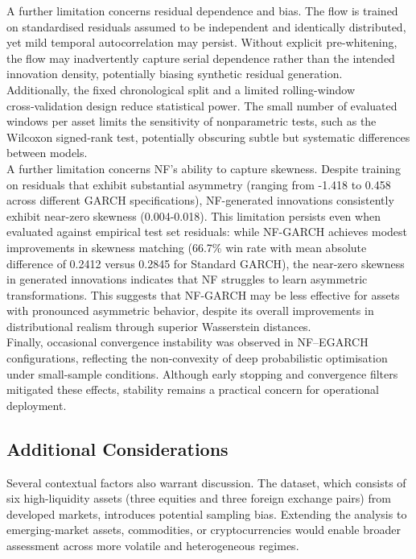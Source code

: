 \documentclass[oneside,12pt]{CUEDthesisPSnPDF}
\begin{document}
\medskip
\noindent
A further limitation concerns residual dependence and bias. The flow is trained on standardised residuals assumed to be independent and identically distributed, yet mild temporal autocorrelation may persist. Without explicit pre-whitening, the flow may inadvertently capture serial dependence rather than the intended innovation density, potentially biasing synthetic residual generation.\\

\medskip
\noindent
Additionally, the fixed chronological split and a limited rolling-window cross‑validation design reduce statistical power. The small number of evaluated windows per asset limits the sensitivity of nonparametric tests, such as the Wilcoxon signed‑rank test, potentially obscuring subtle but systematic differences between models.\\

\medskip
\noindent
A further limitation concerns NF's ability to capture skewness. Despite training on residuals that exhibit substantial asymmetry (ranging from -1.418 to 0.458 across different GARCH specifications), NF-generated innovations consistently exhibit near-zero skewness (0.004-0.018). This limitation persists even when evaluated against empirical test set residuals: while NF-GARCH achieves modest improvements in skewness matching (66.7\% win rate with mean absolute difference of 0.2412 versus 0.2845 for Standard GARCH), the near-zero skewness in generated innovations indicates that NF struggles to learn asymmetric transformations. This suggests that NF-GARCH may be less effective for assets with pronounced asymmetric behavior, despite its overall improvements in distributional realism through superior Wasserstein distances.\\

\medskip
\noindent
Finally, occasional convergence instability was observed in NF–EGARCH configurations, reflecting the non-convexity of deep probabilistic optimisation under small-sample conditions. Although early stopping and convergence filters mitigated these effects, stability remains a practical concern for operational deployment.\\


\subsection*{Additional Considerations}
\noindent
Several contextual factors also warrant discussion. The dataset, which consists of six high-liquidity assets (three equities and three foreign exchange pairs) from developed markets, introduces potential sampling bias. Extending the analysis to emerging-market assets, commodities, or cryptocurrencies would enable broader assessment across more volatile and heterogeneous regimes.\\
\end{document}
